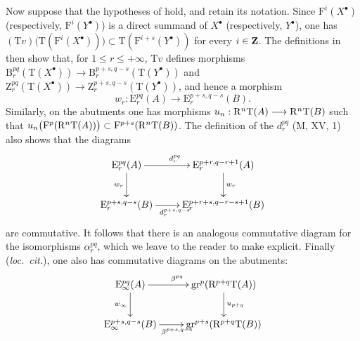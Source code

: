 \begin{env}[13.6.5]
\label{0.13.6.5}
Now suppose that the hypotheses of  hold, and retain
its notation.
Since $\mathrm{F}^i(X^\bullet)$ (respectively,
$\mathrm{F}^i(Y^\bullet)$) is a direct summand of $X^\bullet$
(respectively, $Y^\bullet$), one has $(\mathrm{T}v)\bigl(\mathrm{T}(\mathrm{F}^i(X^\bullet))\bigr)
\subset
\mathrm{T}(\mathrm{F}^{i+s}(Y^\bullet))$
for every $i\in\mathbf{Z}$.
The definitions in  then show that, for
$1\leq r\leq+\infty$, $\mathrm{T}v$ defines morphisms $\mathrm{B}_r^{pq}(\mathrm{T}(X^\bullet))
\longrightarrow
\mathrm{B}_r^{p+s,q-s}(\mathrm{T}(Y^\bullet))$
and $\mathrm{Z}_r^{pq}(\mathrm{T}(X^\bullet))
\longrightarrow
\mathrm{Z}_r^{p+s,q-s}(\mathrm{T}(Y^\bullet))$,
and hence a morphism
\[
  w_r:
  \mathrm{E}_r^{pq}(A)
  \longrightarrow
  \mathrm{E}_r^{p+s,q-s}(B).
\]
Similarly, on the abutments one has morphisms $u_n:
\mathrm{R}^n\mathrm{T}(A)
\longrightarrow
\mathrm{R}^n\mathrm{T}(B)$
such that $u_n\bigl(\mathrm{F}^p(\mathrm{R}^n\mathrm{T}(A))\bigr)
\subset
\mathrm{F}^{p+s}(\mathrm{R}^n\mathrm{T}(B))$.
The definition of the $d_r^{pq}$ (M, XV, 1) also shows that the
diagrams
\[
  \xymatrix{
    \mathrm{E}_r^{pq}(A)
      \ar[r]^{d_r^{pq}}\ar[d]_{w_r}
    &
    \mathrm{E}_r^{p+r,q-r+1}(A)
      \ar[d]^{w_r}
    \\
    \mathrm{E}_r^{p+s,q-s}(B)
      \ar[r]_{d_r^{p+s,q-s}}
    &
    \mathrm{E}_r^{p+r+s,q-r-s+1}(B)
  }
\]
are commutative.
It follows that there is an analogous commutative diagram for the
isomorphisms $\alpha_r^{pq}$, which we leave to the reader to make
explicit.
Finally (\emph{loc.\ cit.}), one also has commutative diagrams on the
abutments:
\[
  \xymatrix{
    \mathrm{E}_\infty^{pq}(A)
      \ar[r]^{\beta^{pq}}\ar[d]_{w_\infty}
    &
    \mathrm{gr}^p(\RR^{p+q}\mathrm{T}(A))
      \ar[d]^{u_{p+q}}
    \\
    \mathrm{E}_\infty^{p+s,q-s}(B)
      \ar[r]_{\beta^{p+s,q-s}}
    &
    \mathrm{gr}^{p+s}(\RR^{p+q}\mathrm{T}(B))
  }
\]
\end{env}

